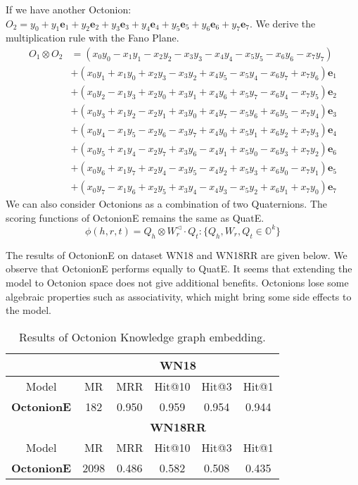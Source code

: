\documentclass{article}
\begin{document}
If we have another Octonion: $O_2 = y_0 + y_1 \textbf{e}_1 + y_2 \textbf{e}_2 + y_3 \textbf{e}_3 + y_4 \textbf{e}_4 + y_5 \textbf{e}_5 + y_6 \textbf{e}_6 + y_7 \textbf{e}_7$. We derive the multiplication rule with the Fano Plane.
\begin{equation}
\begin{split}
    O_1 \otimes O_2 &= (x_0 y_0 - x_1 y_1 - x_2 y_2 - x_3 y_3 - x_4 y_4 - x_5 y_5 - x_6 y_6 - x_7  y_7) \\
    & + (x_0 y_1 + x_1 y_0 + x_2 y_3 - x_3 y_2 + x_4 y_5 - x_5 y_4 - x_6 y_7 + x_7 y_6 ) \textbf{e}_1 \\
    & + (x_0 y_2 - x_1 y_3 + x_2 y_0 + x_3 y_1 + x_4 y_6 + x_5 y_7 - x_6 y_4 - x_7 y_5 ) \textbf{e}_2 \\
    & + (x_0 y_3 + x_1 y_2 - x_2 y_1 + x_3 y_0 + x_4 y_7 - x_5 y_6 + x_6 y_5 - x_7 y_4) \textbf{e}_3 \\
    & + (x_0 y_4 - x_1 y_5 - x_2 y_6 - x_3 y_7 + x_4 y_0 + x_5 y_1 + x_6 y_2 + x_7 y_3) \textbf{e}_4\\
    & + (x_0 y_5 + x_1 y_4 - x_2 y_7 + x_3 y_6 - x_4 y_1 + x_5 y_0 - x_6 y_3 + x_7 y_2) \textbf{e}_6\\
    & + (x_0 y_6 + x_1 y_7 + x_2 y_4 - x_3 y_5 - x_4 y_2 + x_5 y_3 + x_6 y_0 - x_7 y_1) \textbf{e}_5 \\
    & + (x_0 y_7 - x_1 y_6 + x_2 y_5 + x_3 y_4 - x_4 y_3 - x_5 y_2 + x_6 y_1 + x_7 y_0) \textbf{e}_7
\end{split}
\end{equation}
We can also consider Octonions as a combination of two Quaternions. The scoring functions of OctonionE remains the same as QuatE.
\begin{equation}
      \phi(h, r, t) =  Q_h \otimes W_r^{\triangleleft} \cdot Q_t: \{Q_h, W_r,  Q_t \in \mathbb{O}^k\}
\end{equation}

The results of OctonionE on dataset WN18 and WN18RR are given below. We observe that OctonionE performs equally to QuatE. It seems that extending the model to Octonion space does not give additional benefits. Octonions lose some algebraic properties such as associativity, which might bring some side effects to the model.

\begin{table}[h]
\centering
\caption{Results of Octonion Knowledge graph embedding. }
\begin{tabular}{|c|c|c|c|c|c|}
\hline
          & \multicolumn{5}{c|}{\textbf{WN18}}            \\ \hline
Model     & MR    & MRR & Hit@10 & Hit@3 & Hit@1 \\ \hline
\textbf{OctonionE} & 182 &  0.950& 0.959  & 0.954 & 0.944 \\ \hline
          & \multicolumn{5}{c|}{\textbf{WN18RR}}            \\ \hline
Model     & MR    & MRR & Hit@10 & Hit@3 & Hit@1 \\ \hline
\textbf{OctonionE} & 2098  & 0.486 & 0.582 & 0.508 & 0.435 \\ \hline
\end{tabular}
\end{table}
\end{document}
